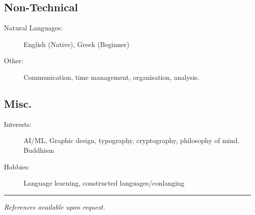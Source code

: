 \documentclass[10pt,a4paper]{article}
\newenvironment{indentsection}[1]%
{\begin{list}{}%
	{\setlength{\leftmargin}{#1}}%
	\item[]%
}
{\end{list}}
\begin{document}
\subsection*{Non-Technical}
\begin{indentsection}{\parindent}
\begin{description}
	\item[Natural Languages:]
	English (Native), Greek (Beginner)
    \item[Other:]
    Communication, time management, organisation, analysis.
\end{description}
\end{indentsection}

\subsection*{Misc.}
\begin{indentsection}{\parindent}
\begin{description}
	\item[Interests:]
	AI/ML, Graphic design, typography, cryptography, philosophy of mind, Buddhism
	\item[Hobbies:]
	Language learning, constructed languages/conlanging
\end{description}
\end{indentsection}

\vspace{1em}
\hrule
\vspace{2em}

\begin{center}
    \color{gray}\small\emph{References available upon request.}
\end{center}
\thispagestyle{empty}
\end{document}
